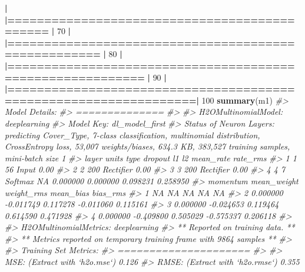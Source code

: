 \documentclass[]{book}
\newenvironment{Shaded}{\begin{snugshade}}{\end{snugshade}}
\newcommand{\CommentTok}[1]{\textcolor[rgb]{0.56,0.35,0.01}{\textit{#1}}}
\newcommand{\DecValTok}[1]{\textcolor[rgb]{0.00,0.00,0.81}{#1}}
\newcommand{\ErrorTok}[1]{\textcolor[rgb]{0.64,0.00,0.00}{\textbf{#1}}}
\newcommand{\KeywordTok}[1]{\textcolor[rgb]{0.13,0.29,0.53}{\textbf{#1}}}
\newcommand{\NormalTok}[1]{#1}
\newcommand{\OperatorTok}[1]{\textcolor[rgb]{0.81,0.36,0.00}{\textbf{#1}}}
\newcommand{\StringTok}[1]{\textcolor[rgb]{0.31,0.60,0.02}{#1}}
\begin{document}
\begin{Shaded}
\begin{Highlighting}[]
{{{{{{{  \OperatorTok{|}\StringTok{                                                                       }
\StringTok{  }\ErrorTok{|=============================================}\StringTok{                    }\ErrorTok{|}\StringTok{  }\DecValTok{70}\NormalTok{%}
  \OperatorTok{|}\StringTok{                                                                       }
\StringTok{  }\ErrorTok{|====================================================}\StringTok{             }\ErrorTok{|}\StringTok{  }\DecValTok{80}\NormalTok{%}
  \OperatorTok{|}\StringTok{                                                                       }
\StringTok{  }\ErrorTok{|==========================================================}\StringTok{       }\ErrorTok{|}\StringTok{  }\DecValTok{90}\NormalTok{%}
  \OperatorTok{|}\StringTok{                                                                       }
\StringTok{  }\ErrorTok{|=================================================================|}\StringTok{ }\DecValTok{100}\NormalTok{%}
\KeywordTok{summary}\NormalTok{(m1)}
\CommentTok{#> Model Details:}
\CommentTok{#> ==============}
\CommentTok{#> }
\CommentTok{#> H2OMultinomialModel: deeplearning}
\CommentTok{#> Model Key:  dl_model_first }
\CommentTok{#> Status of Neuron Layers: predicting Cover_Type, 7-class classification, multinomial distribution, CrossEntropy loss, 53,007 weights/biases, 634.3 KB, 383,527 training samples, mini-batch size 1}
\CommentTok{#>   layer units      type dropout       l1       l2 mean_rate rate_rms}
\CommentTok{#> 1     1    56     Input  0.00 %       NA       NA        NA       NA}
\CommentTok{#> 2     2   200 Rectifier  0.00 % 0.000000 0.000000  0.053201 0.216052}
\CommentTok{#> 3     3   200 Rectifier  0.00 % 0.000000 0.000000  0.010359 0.008217}
\CommentTok{#> 4     4     7   Softmax      NA 0.000000 0.000000  0.098231 0.258950}
\CommentTok{#>   momentum mean_weight weight_rms mean_bias bias_rms}
\CommentTok{#> 1       NA          NA         NA        NA       NA}
\CommentTok{#> 2 0.000000   -0.011749   0.117278 -0.011060 0.115161}
\CommentTok{#> 3 0.000000   -0.024653   0.119464  0.614590 0.471928}
\CommentTok{#> 4 0.000000   -0.409800   0.505029 -0.575337 0.206118}
\CommentTok{#> }
\CommentTok{#> H2OMultinomialMetrics: deeplearning}
\CommentTok{#> ** Reported on training data. **}
\CommentTok{#> ** Metrics reported on temporary training frame with 9864 samples **}
\CommentTok{#> }
\CommentTok{#> Training Set Metrics: }
\CommentTok{#> =====================}
\CommentTok{#> }
\CommentTok{#> MSE: (Extract with `h2o.mse`) 0.126}
\CommentTok{#> RMSE: (Extract with `h2o.rmse`) 0.355}
}}}}}}}}}}}}}}
\end{Highlighting}
\end{Shaded}
\end{document}
